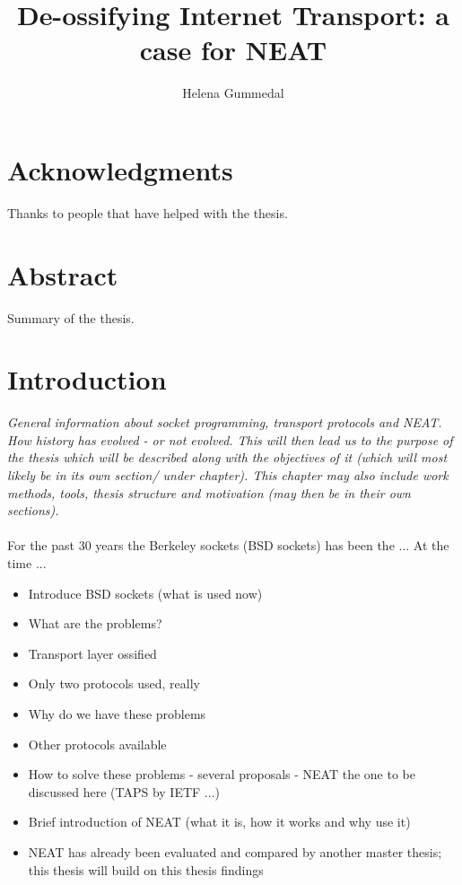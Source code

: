 \documentclass[12pt]{report}
\title{De-ossifying Internet Transport: a case for NEAT}
\author{Helena Gummedal}
\begin{document}
\maketitle

\chapter*{Acknowledgments}%
Thanks to people that have helped with the thesis.

\chapter*{Abstract}%
Summary of the thesis.

\tableofcontents

\chapter{Introduction}
\textit{General information about socket programming, transport protocols and NEAT. How history has evolved - or not evolved. This will then lead us to the purpose of the thesis which will be described along with the objectives of it (which will most likely be in its own section/ under chapter). This chapter may also include work methods, tools, thesis structure and motivation (may then be in their own sections).}  \\
\\
For the past 30 years the Berkeley sockets (BSD sockets) has been the ... At the time ...
\begin{itemize}
\item Introduce BSD sockets (what is used now)
\item What are the problems?
\item Transport layer ossified
\item Only two protocols used, really
\item Why do we have these problems
\item Other protocols available
\item How to solve these problems - several proposals - NEAT the one to be discussed here (TAPS by IETF ...)
\item Brief introduction of NEAT (what it is, how it works and why use it)
\item NEAT has already been evaluated and compared by another master thesis; this thesis will build on this thesis findings
\end{itemize} 
\end{document}
